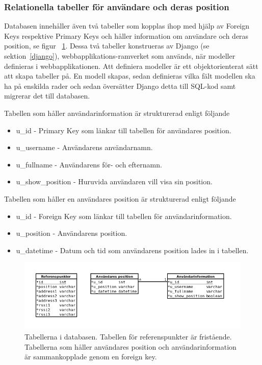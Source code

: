 \documentclass[a4paper,12pt]{article}
\begin{document}
 \subsubsection{Relationella tabeller för användare och deras position}
 Databasen innehåller även två tabeller som
 kopplas ihop med hjälp av Foreign Keys respektive Primary Keys och håller information om användare och deras position, se figur ~\ref{fig:db_tabeller}.
 Dessa två tabeller konstrueras av Django (se sektion~\ref{django}), webbapplikations-ramverket som används, när modeller definieras i webbapplikationen. Att definiera modeller är ett objektorienterat sätt att skapa tabeller på. En modell skapas, sedan definieras vilka fält modellen ska ha på enskilda rader och sedan översätter Django detta till SQL-kod samt migrerar det till databasen.

 Tabellen som håller användarinformation är strukturerad enligt följande
 \begin{itemize}
   \item  u\_id - Primary Key som länkar till tabellen för användares position.
   \item  u\_username - Användarens användarnamn.
   \item  u\_fullname - Användarens för- och efternamn.
   \item  u\_show\_position - Huruvida användaren vill visa sin position.
 \end{itemize}

 Tabellen som håller en användares position är strukturerad enligt följande
 \begin{itemize}
   \item u\_id - Foreign Key som länkar till tabellen för användarinformation.
   \item u\_position - Användarens position.
   \item u\_datetime - Datum och tid som användarens position lades in i tabellen.
 \end{itemize}

 \begin{figure}[H]
   \includegraphics[width=15cm]{media/db_tabeller.png}
   \caption{Tabellerna i databasen. Tabellen för referenspunkter är fristående. Tabellerna som håller användares position och användarinformation är sammankopplade genom en foreign key.}
   \label{fig:db_tabeller}
 \end{figure}
\end{document}
